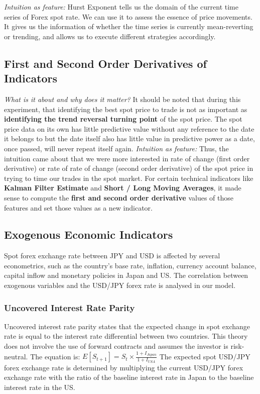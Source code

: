 \documentclass{article}
\begin{document}
\noindent
\textit{Intuition as feature:}
Hurst Exponent tells us the domain of the current time series of Forex spot rate. We can use it to assess the essence of price movements. It gives us the information of whether the time series is currently mean-reverting or trending, and allows us to execute different strategies accordingly. 

\subsection{First and Second Order Derivatives of Indicators}
\textit{What is it about and why does it matter?} It should be noted that during this experiment, that identifying the best spot price to trade is not as important as \textbf{identifying the trend reversal turning point} of the spot price. The spot price data on its own has little predictive value without any reference to the date it belongs to but the date itself also has little value in predictive power as a date, once passed, will never repeat itself again.
\newline
\newline
\textit{Intuition as feature:} Thus, the intuition came about that we were more interested in rate of change (first order derivative) or rate of rate of change (second order derivative) of the spot price in trying to time our trades in the spot market. For certain technical indicators like \textbf{Kalman Filter Estimate} and \textbf{Short / Long Moving Averages}, it made sense to compute the \textbf{first and second order derivative} values of those features and set those values as a new indicator.

\subsection{Exogenous Economic Indicators}
Spot forex exchange rate between JPY and USD is affected by several econometrics, such as the country's base rate, inflation, currency account balance, capital inflow and monetary policies in Japan and US. The correlation between exogenous variables and the USD/JPY forex rate is analysed in our model.
\subsubsection{Uncovered Interest Rate Parity}
Uncovered interest rate parity states that the expected change in spot exchange rate is equal to the interest rate differential between two countries. This theory does not involve the use of forward contracts and assumes the investor is risk-neutral.
\newline
The equation is: 
\(E[S_{t+1}] = S_t \times \frac{1+I_{Japan}}{1+I_{USA}} \)
\newline
\newline
The expected spot USD/JPY forex exchange rate is determined by multiplying the current USD/JPY forex exchange rate with the ratio of the baseline interest rate in Japan to the baseline interest rate in the US.
\end{document}
